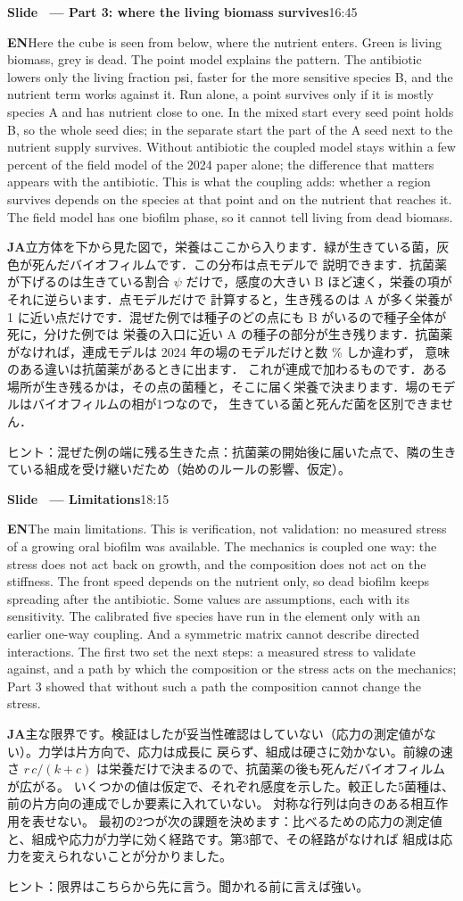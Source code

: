 \documentclass[11pt,a4paper]{article}
\newcounter{sl}
\newcommand{\slide}[2]{\stepcounter{sl}\vspace{8pt}%
  {\color{c3}\large\bfseries Slide \thesl\ --- #1}\hfill{\small #2}\par\vspace{2pt}}
\newcommand{\EN}{\textbf{EN}\quad}
\newcommand{\JA}{\par\textbf{JA}\quad}
\newcommand{\hint}[1]{\par{\color{gray}\small ヒント：#1}}
\begin{document}
\slide{Part 3: where the living biomass survives}{16:45}
\EN Here the cube is seen from below, where the nutrient enters. Green is living biomass, grey is dead. The point
model explains the pattern. The antibiotic lowers only the living fraction psi, faster for the more sensitive species
B, and the nutrient term works against it. Run alone, a point survives only if it is mostly species A and has nutrient
close to one. In the mixed start every seed point holds B, so the whole seed dies; in the separate start the part of
the A seed next to the nutrient supply survives. Without antibiotic the coupled model stays within a few percent of the
field model of the 2024 paper alone; the difference that matters appears with the antibiotic.
This is what the coupling adds: whether a region survives depends on the species at that point and on the nutrient
that reaches it. The field model has one biofilm phase, so it cannot tell living from dead biomass.
\JA 立方体を下から見た図で，栄養はここから入ります．緑が生きている菌，灰色が死んだバイオフィルムです．この分布は点モデルで
説明できます．抗菌薬が下げるのは生きている割合 $\psi$ だけで，感度の大きい B ほど速く，栄養の項がそれに逆らいます．点モデルだけで
計算すると，生き残るのは A が多く栄養が 1 に近い点だけです．混ぜた例では種子のどの点にも B がいるので種子全体が死に，分けた例では
栄養の入口に近い A の種子の部分が生き残ります．抗菌薬がなければ，連成モデルは 2024 年の場のモデルだけと数 \% しか違わず，
意味のある違いは抗菌薬があるときに出ます．
これが連成で加わるものです．ある場所が生き残るかは，その点の菌種と，そこに届く栄養で決まります．場のモデルはバイオフィルムの相が1つなので，
生きている菌と死んだ菌を区別できません．
\hint{混ぜた例の端に残る生きた点：抗菌薬の開始後に届いた点で、隣の生きている組成を受け継いだため（始めのルールの影響、仮定）。}

\slide{Limitations}{18:15}
\EN The main limitations. This is verification, not validation: no measured
stress of a growing oral biofilm was available. The mechanics is coupled one way: the stress does not act back
on growth, and the composition does not act on the stiffness. The front speed depends on the nutrient only, so
dead biofilm keeps spreading after the antibiotic. Some values are assumptions, each with its sensitivity. The
calibrated five species have run in the element only with an earlier one-way coupling. And a symmetric matrix
cannot describe directed interactions. The first two set the next steps: a measured stress to validate against,
and a path by which the composition or the stress acts on the mechanics; Part 3 showed that without such a path the
composition cannot change the stress.
\JA 主な限界です。検証はしたが妥当性確認はしていない（応力の測定値がない）。力学は片方向で、応力は成長に
戻らず、組成は硬さに効かない。前線の速さ $r\,c/(k+c)$ は栄養だけで決まるので、抗菌薬の後も死んだバイオフィルムが広がる。
いくつかの値は仮定で、それぞれ感度を示した。較正した5菌種は、前の片方向の連成でしか要素に入れていない。
対称な行列は向きのある相互作用を表せない。
最初の2つが次の課題を決めます：比べるための応力の測定値と、組成や応力が力学に効く経路です。第3部で、その経路がなければ
組成は応力を変えられないことが分かりました。
\hint{限界はこちらから先に言う。聞かれる前に言えば強い。}
\end{document}
